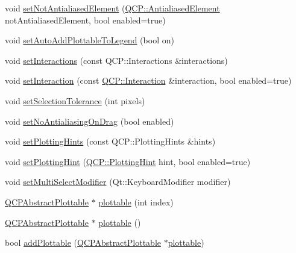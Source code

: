 \begin{DoxyCompactItemize}
\item 
void \mbox{\hyperlink{class_q_custom_plot_afc657938a707c890e449ae89203a076d}{set\+Not\+Antialiased\+Element}} (\mbox{\hyperlink{namespace_q_c_p_ae55dbe315d41fe80f29ba88100843a0c}{Q\+C\+P\+::\+Antialiased\+Element}} not\+Antialiased\+Element, bool enabled=true)
\item 
void \mbox{\hyperlink{class_q_custom_plot_ad8858410c2db47b7104040a3aa61c3fc}{set\+Auto\+Add\+Plottable\+To\+Legend}} (bool on)
\item 
void \mbox{\hyperlink{class_q_custom_plot_a5ee1e2f6ae27419deca53e75907c27e5}{set\+Interactions}} (const Q\+C\+P\+::\+Interactions \&interactions)
\item 
void \mbox{\hyperlink{class_q_custom_plot_a422bf1bc6d56dac75a3d805d9a65902c}{set\+Interaction}} (const \mbox{\hyperlink{namespace_q_c_p_a2ad6bb6281c7c2d593d4277b44c2b037}{Q\+C\+P\+::\+Interaction}} \&interaction, bool enabled=true)
\item 
void \mbox{\hyperlink{class_q_custom_plot_a4dc31241d7b09680950e19e5f971ed93}{set\+Selection\+Tolerance}} (int pixels)
\item 
void \mbox{\hyperlink{class_q_custom_plot_a775bdcb6329d44701aeaa6135b0e5265}{set\+No\+Antialiasing\+On\+Drag}} (bool enabled)
\item 
void \mbox{\hyperlink{class_q_custom_plot_a94a33cbdadbbac5934843508bcfc210d}{set\+Plotting\+Hints}} (const Q\+C\+P\+::\+Plotting\+Hints \&hints)
\item 
void \mbox{\hyperlink{class_q_custom_plot_a3b7c97bb6c16464e9e15190c07abe9a9}{set\+Plotting\+Hint}} (\mbox{\hyperlink{namespace_q_c_p_a5400e5fcb9528d92002ddb938c1f4ef4}{Q\+C\+P\+::\+Plotting\+Hint}} hint, bool enabled=true)
\item 
void \mbox{\hyperlink{class_q_custom_plot_a8fc96e3b5138a06759a2a90c166df516}{set\+Multi\+Select\+Modifier}} (Qt\+::\+Keyboard\+Modifier modifier)
\item 
\mbox{\hyperlink{class_q_c_p_abstract_plottable}{Q\+C\+P\+Abstract\+Plottable}} $\ast$ \mbox{\hyperlink{class_q_custom_plot_a32de81ff53e263e785b83b52ecd99d6f}{plottable}} (int index)
\item 
\mbox{\hyperlink{class_q_c_p_abstract_plottable}{Q\+C\+P\+Abstract\+Plottable}} $\ast$ \mbox{\hyperlink{class_q_custom_plot_adea38bdc660da9412ba69fb939031567}{plottable}} ()
\item 
bool \mbox{\hyperlink{class_q_custom_plot_ab7ad9174f701f9c6f64e378df77927a6}{add\+Plottable}} (\mbox{\hyperlink{class_q_c_p_abstract_plottable}{Q\+C\+P\+Abstract\+Plottable}} $\ast$\mbox{\hyperlink{class_q_custom_plot_a32de81ff53e263e785b83b52ecd99d6f}{plottable}})

\end{DoxyCompactItemize}
